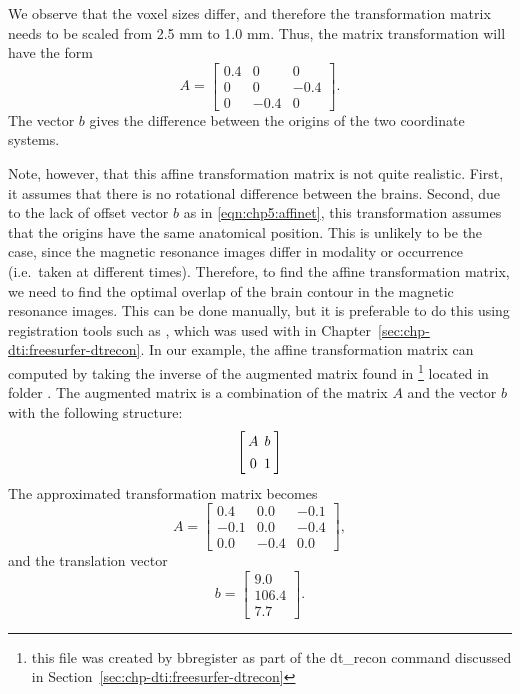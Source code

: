 
We observe that the voxel sizes differ, and therefore the transformation matrix 
needs to be scaled from 2.5 mm to 1.0 mm. Thus, the matrix transformation will 
have the form 
\[
A = \left[
\begin{array}{ccc}
0.4 & 0 & 0 \\
0 & 0 & -0.4 \\
0 & -0.4 & 0
\end{array}\right].
\]
The vector $b$ gives the difference between the origins of the two
coordinate systems.

Note, however, that this affine transformation matrix is not quite
realistic. First, it assumes that there is no rotational difference
between the brains. Second, due to the lack of offset vector $b$ as in 
\eqref{eqn:chp5:affinet}, this transformation assumes that the origins have 
the same anatomical position. This is unlikely to be the case, since the 
magnetic resonance images differ in modality or occurrence (i.e.~taken at 
different times).  %
Therefore, to find the affine transformation matrix, we need to find the 
optimal overlap of the brain contour in the magnetic resonance images. This can 
be done manually, but it is preferable to do this using registration tools 
such as , which was used with
 in Chapter~\ref{sec:chp-dti:freesurfer-dtrecon}. In
our example, the affine transformation matrix can computed by taking
the inverse of the augmented matrix found in \footnote{this 
file was created by bbregister as part of the dt\_recon command discussed 
in Section~\ref{sec:chp-dti:freesurfer-dtrecon}} located in folder 
. The augmented matrix is a combination of the 
matrix $A$ and the vector $b$ with the following structure:
\[\arraycolsep=2.0pt\def\arraystretch{1.3}
\left[
\begin{array}{cc}
  A  & b \\
  0 & 1\\
\end{array}\right]
\] 
The approximated
transformation matrix becomes
\[
A = \left[
\begin{array}{ccc}
  0.4 & 0.0 &-0.1 \\
 -0.1 & 0.0 &-0.4 \\
  0.0 &-0.4 & 0.0 
\end{array}\right],
\]
and the translation vector 
\[
b = \left[
\begin{array}{c}
  9.0 \\
106.4 \\
  7.7
\end{array}\right].
\]










